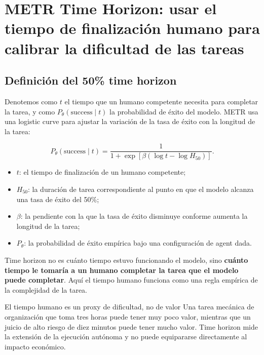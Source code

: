 \section{METR Time Horizon: usar el tiempo de finalización humano para calibrar la dificultad de las tareas}

\subsection{Definición del 50\% time horizon}


Denotemos como $t$ el tiempo que un humano competente necesita para completar la tarea, y como $P_\theta(\text{success}\mid t)$ la probabilidad de éxito del modelo. METR usa una logistic curve para ajustar la variación de la tasa de éxito con la longitud de la tarea:

$$
P_\theta(\text{success}\mid t)=
\frac{1}{1+\exp\left[\beta\left(\log t-\log H_{50}\right)\right]}.
$$

\begin{itemize}
    \item $t$: el tiempo de finalización de un humano competente;
    \item $H_{50}$: la duración de tarea correspondiente al punto en que el modelo alcanza una tasa de éxito del 50\%;
    \item $\beta$: la pendiente con la que la tasa de éxito disminuye conforme aumenta la longitud de la tarea;
    \item $P_\theta$: la probabilidad de éxito empírica bajo una configuración de agent dada.
\end{itemize}

Time horizon no es cuánto tiempo estuvo funcionando el modelo, sino \textbf{cuánto tiempo le tomaría a un humano completar la tarea que el modelo puede completar}. Aquí el tiempo humano funciona como una regla empírica de la complejidad de la tarea.

\begin{importantbox}{El tiempo humano es un proxy de dificultad, no de valor}
Una tarea mecánica de organización que toma tres horas puede tener muy poco valor, mientras que un juicio de alto riesgo de diez minutos puede tener mucho valor. Time horizon mide la extensión de la ejecución autónoma y no puede equipararse directamente al impacto económico.
\end{importantbox}

